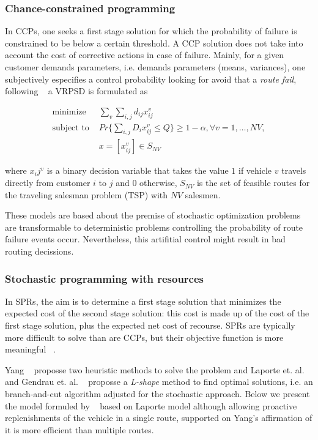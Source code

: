  
\subsubsection{Chance-constrained programming}

In CCPs, one seeks a first stage solution for which the probability of failure is constrained to be below a certain threshold. A CCP solution does not take into account the cost of corrective actions in case of failure. Mainly, for a given customer demands parameters, i.e. demands parameters (means, variances), one subjectively especifies a control probability looking for avoid that a \textit{route fail}, following ~\cite{Dror_2005} a VRPSD is formulated as

\begin{align}\label{eq:CCP}
 \text{minimize } & \sum_v\sum_{i,j}d_{ij}x_{ij}^v\\
 \text{subject to } & Pr\{\sum_{i,j}D_ix_{ij}^v \leq Q\} \geq 1-\alpha, \forall v = 1,\ldots,NV,\\
  & x = [x_{ij}^v] \in S_{NV}
\end{align}

where $x_ij^v$ is a binary decision variable that takes the value $1$ if vehicle $v$ travels directly from customer $i$ to $j$ and $0$ otherwise, $S_{NV}$ is the set of feasible routes for the traveling salesman problem (TSP) with $NV$ salesmen.

These models are based about the premise of stochastic optimization problems are transformable to deterministic problems controlling the probability of route failure events occur. Nevertheless, this artifitial control might result in bad routing decissions.


\subsubsection{Stochastic programming with resources}

In SPRs, the aim is to determine a first stage solution that minimizes the expected cost of the second stage solution: this cost is made up of the cost of the first stage solution, plus the expected net cost of recourse. SPRs are typically more difficult to solve than are CCPs, but their objective function is more meaningful ~\cite{gendreau_stochastic_1996}.


Yang ~\cite{yang_stochastic_2000} proposse two heuristic methods to solve the problem and Laporte et. al. ~\cite{laporte_integer_2002} and Gendrau et. al. ~\cite{gendreau_exact_1995} proposse a \textit{L-shape} method to find optimal solutions, i.e. an branch-and-cut algorithm adjusted for the stochastic approach. Below we present the model formuled by ~\cite{Dror_2005} based on Laporte model although allowing proactive replenishments of the vehicle in a single route, supported on Yang's affirmation of it is more efficient than multiple routes.

